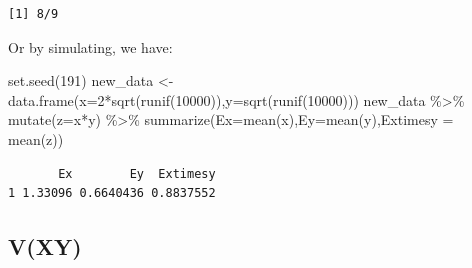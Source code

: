 \documentclass[
  letterpaper,
  DIV=11,
  numbers=noendperiod]{scrreprt}
\newenvironment{Shaded}{\begin{snugshade}}{\end{snugshade}}
\newcommand{\AttributeTok}[1]{\textcolor[rgb]{0.40,0.45,0.13}{#1}}
\newcommand{\ControlFlowTok}[1]{\textcolor[rgb]{0.00,0.23,0.31}{#1}}
\newcommand{\DecValTok}[1]{\textcolor[rgb]{0.68,0.00,0.00}{#1}}
\newcommand{\FunctionTok}[1]{\textcolor[rgb]{0.28,0.35,0.67}{#1}}
\newcommand{\NormalTok}[1]{\textcolor[rgb]{0.00,0.23,0.31}{#1}}
\newcommand{\OtherTok}[1]{\textcolor[rgb]{0.00,0.23,0.31}{#1}}
\newcommand{\SpecialCharTok}[1]{\textcolor[rgb]{0.37,0.37,0.37}{#1}}
\begin{document}
\begin{Shaded}
\end{Shaded}

\begin{verbatim}
[1] 8/9
\end{verbatim}

Or by simulating, we have:

\begin{Shaded}
\begin{Highlighting}[]
\FunctionTok{set.seed}\NormalTok{(}\DecValTok{191}\NormalTok{)}
\NormalTok{new\_data }\OtherTok{\textless{}{-}} \FunctionTok{data.frame}\NormalTok{(}\AttributeTok{x=}\DecValTok{2}\SpecialCharTok{*}\FunctionTok{sqrt}\NormalTok{(}\FunctionTok{runif}\NormalTok{(}\DecValTok{10000}\NormalTok{)),}\AttributeTok{y=}\FunctionTok{sqrt}\NormalTok{(}\FunctionTok{runif}\NormalTok{(}\DecValTok{10000}\NormalTok{)))}
\NormalTok{new\_data }\SpecialCharTok{\%\textgreater{}\%}
  \FunctionTok{mutate}\NormalTok{(}\AttributeTok{z=}\NormalTok{x}\SpecialCharTok{*}\NormalTok{y) }\SpecialCharTok{\%\textgreater{}\%}
  \FunctionTok{summarize}\NormalTok{(}\AttributeTok{Ex=}\FunctionTok{mean}\NormalTok{(x),}\AttributeTok{Ey=}\FunctionTok{mean}\NormalTok{(y),}\AttributeTok{Extimesy =} \FunctionTok{mean}\NormalTok{(z))}
\end{Highlighting}
\end{Shaded}

\begin{verbatim}
       Ex        Ey  Extimesy
1 1.33096 0.6640436 0.8837552
\end{verbatim}

\subsection{V(XY)}\label{vxy}
\end{document}
